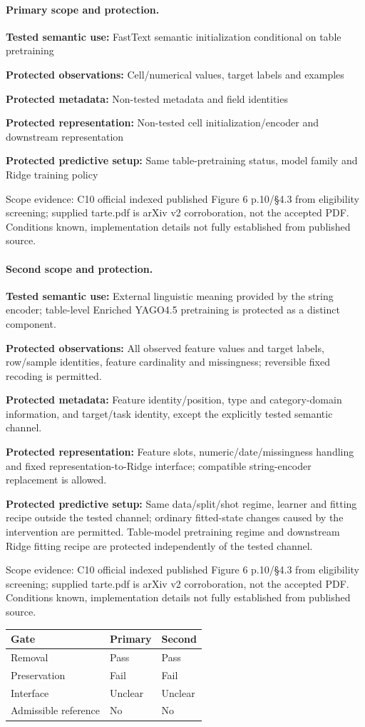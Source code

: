 \documentclass[10pt]{article}
\begin{document}
\paragraph{Primary scope and protection.}
\textbf{Tested semantic use:} FastText semantic initialization conditional on table pretraining\par
\textbf{Protected observations:} Cell/numerical values, target labels and examples\par
\textbf{Protected metadata:} Non-tested metadata and field identities\par
\textbf{Protected representation:} Non-tested cell initialization/encoder and downstream representation\par
\textbf{Protected predictive setup:} Same table-pretraining status, model family and Ridge training policy\par
Scope evidence: C10 official indexed published Figure 6 p.10/§4.3 from eligibility screening; supplied tarte.pdf is arXiv v2 corroboration, not the accepted PDF. Conditions known, implementation details not fully established from published source.\par
\paragraph{Second scope and protection.}
\textbf{Tested semantic use:} External linguistic meaning provided by the string encoder; table-level Enriched YAGO4.5 pretraining is protected as a distinct component.\par
\textbf{Protected observations:} All observed feature values and target labels, row/sample identities, feature cardinality and missingness; reversible fixed recoding is permitted.\par
\textbf{Protected metadata:} Feature identity/position, type and category-domain information, and target/task identity, except the explicitly tested semantic channel.\par
\textbf{Protected representation:} Feature slots, numeric/date/missingness handling and fixed representation-to-Ridge interface; compatible string-encoder replacement is allowed.\par
\textbf{Protected predictive setup:} Same data/split/shot regime, learner and fitting recipe outside the tested channel; ordinary fitted-state changes caused by the intervention are permitted. Table-model pretraining regime and downstream Ridge fitting recipe are protected independently of the tested channel.\par
Scope evidence: C10 official indexed published Figure 6 p.10/§4.3 from eligibility screening; supplied tarte.pdf is arXiv v2 corroboration, not the accepted PDF. Conditions known, implementation details not fully established from published source.\par
\begin{tabular}{lll}\toprule Gate & Primary & Second \\ \midrule
Removal & Pass & Pass \\
Preservation & Fail & Fail \\
Interface & Unclear & Unclear \\
Admissible reference & No & No \\
\bottomrule\end{tabular}
\end{document}
